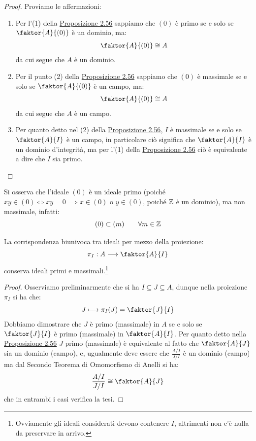 \documentclass[11pt]{scrartcl}
\begin{document}
\begin{proof}
    Proviamo le affermazioni:
    \begin{enumerate}[(1)]
        \item Per l'(1) della \hyperref[2.56]{Proposizione 2.56} sappiamo che $(0)$ è primo se e solo se $\faktor{A}{(0)}$ è un dominio, ma:
            \[ \faktor{A}{(0)} \cong A
                \]
            da cui segue che $A$ è un dominio.
        \item Per il punto (2) della \hyperref[2.56]{Proposizione 2.56} sappiamo che $(0)$ è massimale se e solo se $\faktor{A}{(0)}$ è un campo, ma:
            \[ \faktor{A}{(0)} \cong A
                \]
            da cui segue che $A$ è un campo.
        \item Per quanto detto nel (2) della \hyperref[2.56]{Proposizione 2.56}, $I$ è massimale se e solo se $\faktor{A}{I}$ è un campo, in particolare ciò 
            significa che $\faktor{A}{I}$ è un dominio d'integrità, ma per l'(1) della \hyperref[2.56]{Proposizione 2.56} ciò è equivalente a dire che $I$ sia primo.
    \end{enumerate}
\end{proof}

\begin{example}
    Si osserva che l'ideale $(0)$ è un ideale primo (poiché $xy \in (0) \iff xy = 0 \implies x \in (0)$ o $y \in (0)$, poiché $\mathbb Z$ è un dominio), ma non massimale, infatti:
        \[ (0) \subset (m) \qquad \forall m \in \mathbb Z
            \]
\end{example}

\begin{corollary}
    La corrispondenza biunivoca tra ideali per mezzo della proiezione:
    \[ \pi_I : A \longrightarrow \faktor{A}{I}
        \]
    conserva ideali primi e massimali.\footnote{Ovviamente gli ideali considerati devono contenere $I$, altrimenti non c'è nulla da preservare in arrivo.}
\end{corollary}

\begin{proof}
    Osserviamo preliminarmente che si ha $I \subseteq J \subseteq A$, dunque nella proiezione $\pi_I$ si ha che:
        \[ J \longmapsto \pi_I(J) = \faktor{J}{I}
            \]
    Dobbiamo dimostrare che $J$ è primo (massimale) in $A$ se e solo se $\faktor{J}{I}$ è primo (massimale) in $\faktor{A}{I}$. Per quanto detto nella \hyperref[2.56]{Proposizione 2.56} $J$ primo (massimale) 
    è equivalente al fatto che $\faktor{A}{J}$ sia un dominio (campo), e, ugualmente deve essere che $\displaystyle\frac{A/I}{J/I}$ è un dominio (campo) ma dal Secondo Teorema di Omomorfismo di Anelli si ha:
    \[ \frac{A/I}{J/I} \cong \faktor{A}{J}
        \]
    che in entrambi i casi verifica la tesi.
\end{proof}
\end{document}
